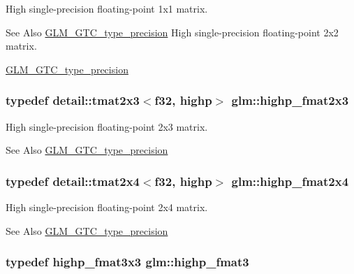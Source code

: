 High single-\/precision floating-\/point 1x1 matrix. \begin{DoxySeeAlso}{See Also}
\hyperlink{group__gtc__type__precision}{G\-L\-M\-\_\-\-G\-T\-C\-\_\-type\-\_\-precision} High single-\/precision floating-\/point 2x2 matrix. 

\hyperlink{group__gtc__type__precision}{G\-L\-M\-\_\-\-G\-T\-C\-\_\-type\-\_\-precision} 
\end{DoxySeeAlso}
\hypertarget{group__gtc__type__precision_ga53c126d1650b460bc7496a6fd5e5e764}{
\subsubsection[{highp\-\_\-fmat2x3}]{\setlength{\rightskip}{0pt plus 5cm}typedef detail\-::tmat2x3$<$f32, highp$>$ {\bf glm\-::highp\-\_\-fmat2x3}}}\label{group__gtc__type__precision_ga53c126d1650b460bc7496a6fd5e5e764}
High single-\/precision floating-\/point 2x3 matrix. \begin{DoxySeeAlso}{See Also}
\hyperlink{group__gtc__type__precision}{G\-L\-M\-\_\-\-G\-T\-C\-\_\-type\-\_\-precision} 
\end{DoxySeeAlso}
\hypertarget{group__gtc__type__precision_ga5df8430c47272adc901ef224d85a9c4d}{
\subsubsection[{highp\-\_\-fmat2x4}]{\setlength{\rightskip}{0pt plus 5cm}typedef detail\-::tmat2x4$<$f32, highp$>$ {\bf glm\-::highp\-\_\-fmat2x4}}}\label{group__gtc__type__precision_ga5df8430c47272adc901ef224d85a9c4d}
High single-\/precision floating-\/point 2x4 matrix. \begin{DoxySeeAlso}{See Also}
\hyperlink{group__gtc__type__precision}{G\-L\-M\-\_\-\-G\-T\-C\-\_\-type\-\_\-precision} 
\end{DoxySeeAlso}
\hypertarget{group__gtc__type__precision_ga3ff9af2eba26aa6df92aa73e1083e81e}{
\subsubsection[{highp\-\_\-fmat3}]{\setlength{\rightskip}{0pt plus 5cm}typedef highp\-\_\-fmat3x3 {\bf glm\-::highp\-\_\-fmat3}}}\label{group__gtc__type__precision_ga3ff9af2eba26aa6df92aa73e1083e81e}
